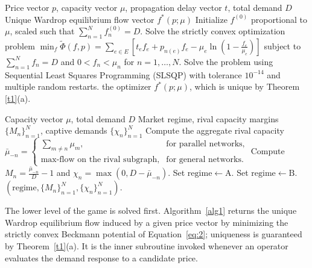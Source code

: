 \documentclass[review,3p,authoryear]{elsarticle}
\begin{document}
\begin{algorithm}[!h]
\caption{Computation of the Wardrop Equilibrium for General $N$}
\label{alg1}
\begin{algorithmic}[1]
\Require Price vector $p$, capacity vector ${\mu}$, propagation delay vector $t$, total demand $D$
\Ensure Unique Wardrop equilibrium flow vector $f^{*}(p;{\mu})$
\State Initialize $f^{\left(0\right)}$ proportional to ${\mu}$, scaled such that $\sum_{n=1}^{N} f_{n}^{\left(0\right)} = D$.
\State Solve the strictly convex optimization problem
\Statex $\min_{f} \tilde{{\Phi}}(f,p)=\sum_{e{\in}E}^{} \left[t_{e}f_{e}+p_{n(e)}f_{e}-{\mu}_{e}\ln\left(1 - \frac{f_{e}}{{\mu}_{e}}\right)\right]$
\Statex subject to $\sum_{n=1}^{N} f_{n}=D$ and $0 < f_{n} < {\mu}_{n}$ for $n=1,{\dots},N$.
\State Solve the problem using Sequential Least Squares Programming (SLSQP) with tolerance $10^{-14}$ and multiple random restarts.
\State \Return the optimizer $f^{*}(p;{\mu})$, which is unique by Theorem \ref{t1}(a).
\end{algorithmic}
\end{algorithm}

\begin{algorithm}[!h]
\caption{Market Regime Classification for General $N$}
\label{alg2}
\begin{algorithmic}[1]
\Require Capacity vector ${\mu}$, total demand $D$
\Ensure Market regime, rival capacity margins $\{M_{n}\}_{n=1}^{N}$, captive demands $\{{\chi}_{n}\}_{n=1}^{N}$
    \State Compute the aggregate rival capacity
    \Statex $\bar{{\mu}}_{-n}=\begin{cases}
        \sum_{m{\ne}n}^{} {\mu}_{m}, & \text{for parallel networks}, \\
        \text{max-flow on the rival subgraph}, & \text{for general networks}.
    \end{cases}$
    \State Compute $M_{n}=\frac{\bar{{\mu}}_{-n}}{D}-1$ and ${\chi}_{n}=\max\left(0,D-\bar{{\mu}}_{-n}\right)$.
\EndFor
{}
    \State Set $\mathrm{regime} \gets \mathrm{A}$.
\Else
    \State Set $\mathrm{regime} \gets \mathrm{B}$.
\EndIf
\State \Return $\left(\mathrm{regime},\{M_{n}\}_{n=1}^{N},\{{\chi}_{n}\}_{n=1}^{N}\right)$.
\end{algorithmic}
\end{algorithm}

The lower level of the game is solved first. Algorithm~\ref{alg1} returns the unique Wardrop equilibrium flow induced by a given price vector by minimizing the strictly convex Beckmann potential of Equation~\eqref{eq:2}; uniqueness is guaranteed by Theorem~\ref{t1}(a). It is the inner subroutine invoked whenever an operator evaluates the demand response to a candidate price.
\end{document}
